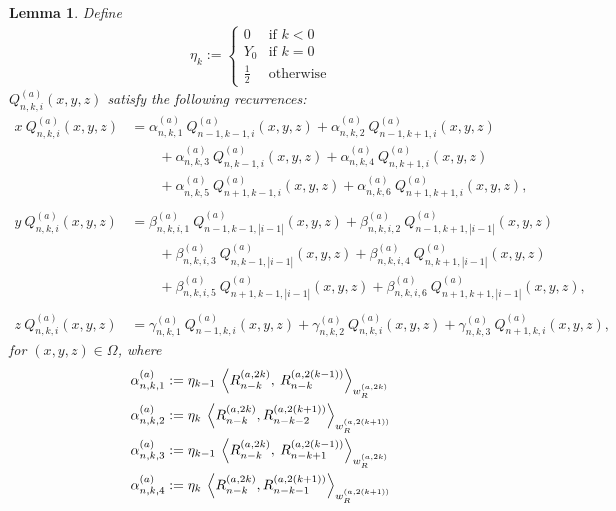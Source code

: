 \documentclass[11pt, oneside]{article}   	%
\newcommand{\half}{\frac{1}{2}}
\newcommand{\genjac}{R}
\newcommand{\genjacnmk}{\genjac_{n-k}}
\newcommand{\genjacw}{w_\genjac}
\newcommand{\scop}{Q}
\newcommand{\scopnki}{\scop_{n,k,i}}
\newcommand{\scopa}{\scop^{(a)}}
\newcommand{\scopnkia}{\scopnki^{(a)}}
\newcommand{\ch}{Y}
\newcommand{\alphaa}{\alpha^{(a)}}
\newcommand{\betaa}{\beta^{(a)}}
\newcommand{\gammaa}{\gamma^{(a)}}
\newtheorem{lemma}{Lemma}
\begin{document}
\begin{lemma}\label{lemma:Qrecurrence} 
Define
\begin{align}
	\eta_{k} :=
		\begin{cases}
			0 &\text{if } k < 0 \\
			\ch_0 &\text{if } k = 0 \\
			\half &\text{otherwise}
		\end{cases}
\end{align}
$\scopnkia(x,y,z)$ satisfy the following recurrences:
\begin{align*}
	x \: \scopnkia(x,y,z) &= \alphaa_{n,k,1} \:  \scopa_{n-1, k-1, i}(x, y, z) + \alphaa_{n,k,2} \:  \scopa_{n-1, k+1, i}(x, y, z) \nonumber \\
		& \quad \quad + \alphaa_{n,k,3} \:  \scopa_{n, k-1, i}(x, y, z) + \alphaa_{n,k,4} \:  \scopa_{n, k+1, i}(x, y, z) \nonumber \\
		& \quad \quad + \alphaa_{n,k,5} \:  \scopa_{n+1, k-1, i}(x, y, z) + \alphaa_{n,k,6} \:  \scopa_{n+1, k+1, i}(x, y, z), \\ \\
	y \: \scopnkia(x,y,z) &= \betaa_{n,k,i,1} \:  \scopa_{n-1, k-1, |i-1|}(x, y, z) + \betaa_{n,k,i,2} \:  \scopa_{n-1, k+1, |i-1|}(x, y, z) \nonumber \\
		& \quad \quad + \betaa_{n,k,i,3} \:  \scopa_{n, k-1, |i-1|}(x, y, z) + \betaa_{n,k,i,4} \:  \scopa_{n, k+1, |i-1|}(x, y, z) \nonumber \\
		& \quad \quad + \betaa_{n,k,i,5} \:  \scopa_{n+1, k-1, |i-1|}(x, y, z) + \betaa_{n,k,i,6} \:  \scopa_{n+1, k+1, |i-1|}(x, y, z), \\ \\
	z \: \scopnkia(x,y,z) &= \gammaa_{n,k,1} \: \scopa_{n-1, k, i}(x, y, z) + \gammaa_{n,k,2} \: \scopa_{n, k, i}(x, y, z) + \gammaa_{n,k,3} \: \scopa_{n+1, k, i}(x, y, z),
\end{align*}
for $(x,y,z) \in \Omega$, where
\begin{align*}
	\alphaa_{n,k,1} &:= \eta_{k-1} \: \ip<\genjacnmk^{(a, 2k)}, \: \genjacnmk^{(a, 2(k-1))}>_{\genjacw^{(a, 2k)}} \\
	\alphaa_{n,k,2} &:= \eta_{k} \: \ip<\genjacnmk^{(a, 2k)}, \genjac_{n-k-2}^{(a, 2(k+1))}>_{\genjacw^{(a, 2(k+1))}} \\
	\alphaa_{n,k,3} &:=\eta_{k-1} \: \ip<\genjacnmk^{(a, 2k)}, \: \genjac_{n-k+1}^{(a, 2(k-1))}>_{\genjacw^{(a, 2k)}} \\
	\alphaa_{n,k,4} &:= \eta_{k} \: \ip<\genjacnmk^{(a, 2k)}, \genjac_{n-k-1}^{(a, 2(k+1))}>_{\genjacw^{(a, 2(k+1))}} \\

\end{align*}
\end{lemma}
\end{document}
